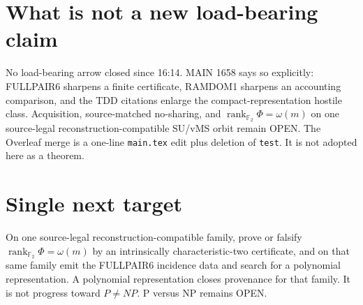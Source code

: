 \documentclass[11pt]{article}
\begin{document}
\section*{What is not a new load-bearing claim}
No load-bearing arrow closed since 16:14. MAIN 1658 says so explicitly: FULLPAIR6
sharpens a finite certificate, RAMDOM1 sharpens an accounting comparison, and the TDD
citations enlarge the compact-representation hostile class. Acquisition, source-matched
no-sharing, and
\(\operatorname{rank}_{\mathbb F_2}\Phi=\omega(m)\)
on one source-legal reconstruction-compatible SU/vMS orbit remain OPEN.
The Overleaf merge is a one-line \texttt{main.tex} edit plus deletion of \texttt{test}.
It is not adopted here as a theorem.

\section*{Single next target}
On one source-legal reconstruction-compatible family, prove or falsify
\(\operatorname{rank}_{\mathbb F_2}\Phi=\omega(m)\) by an intrinsically
characteristic-two certificate, and on that same family emit the FULLPAIR6 incidence
data and search for a polynomial representation. A polynomial representation closes
provenance for that family. It is not progress toward \(P\neq NP\).
P versus NP remains OPEN.

\end{document}
